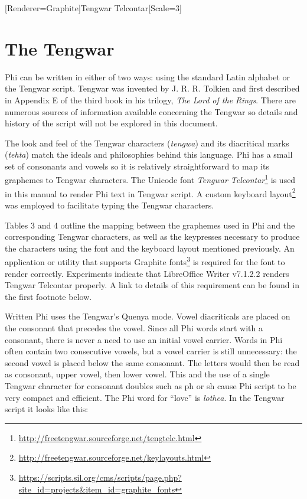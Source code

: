 \newfontfamily{\ttbig}[Renderer=Graphite]{Tengwar Telcontar}[Scale=3]

\section{The Tengwar}
Phi can be written in either of two ways: using the standard Latin alphabet or the Tengwar script. Tengwar was invented by J. R. R. Tolkien and first described in Appendix E of the third book in his trilogy, \emph{The Lord of the Rings}. There are numerous sources of information available concerning the Tengwar so details and history of the script will not be explored in this document.

The look and feel of the Tengwar characters (\emph{tengwa}) and its diacritical marks (\emph{tehta}) match the ideals and philosophies behind this language. Phi has a small set of consonants and vowels so it is relatively straightforward to map its graphemes to Tengwar characters. The Unicode font \emph{Tengwar Telcontar}\footnote{\hspace{0.1em}\url{http://freetengwar.sourceforge.net/tengtelc.html}} is used in this manual to render Phi text in Tengwar script. A custom keyboard layout\footnote{\hspace{0.1em}\url{http://freetengwar.sourceforge.net/keylayouts.html}} was employed to facilitate typing the Tengwar characters.

Tables 3 and 4 outline the mapping between the graphemes used in Phi and the corresponding Tengwar characters, as well as the keypresses necessary to produce the characters using the font and the keyboard layout mentioned previously. An application or utility that supports Graphite fonts\footnote{\hspace{0.1em}\url{https://scripts.sil.org/cms/scripts/page.php?site\_id=projects\&item\_id=graphite\_fonts}} is required for the font to render correctly. Experiments indicate that LibreOffice Writer v7.1.2.2 renders Tengwar Telcontar properly. A link to details of this requirement can be found in the first footnote below.

Written Phi uses the Tengwar’s Quenya mode. Vowel diacriticals are placed on the consonant that precedes the vowel. Since all Phi words start with a consonant, there is never a need to use an initial vowel carrier. Words in Phi often contain two consecutive vowels, but a vowel carrier is still unnecessary: the second vowel is placed below the same consonant. The letters would then be read as consonant, upper vowel, then lower vowel. This and the use of a single Tengwar character for consonant doubles such as ph or sh cause Phi script to be very compact and efficient.
\clearpage
The Phi word for “love” is \emph{lothea}. In the Tengwar script it looks like this:

